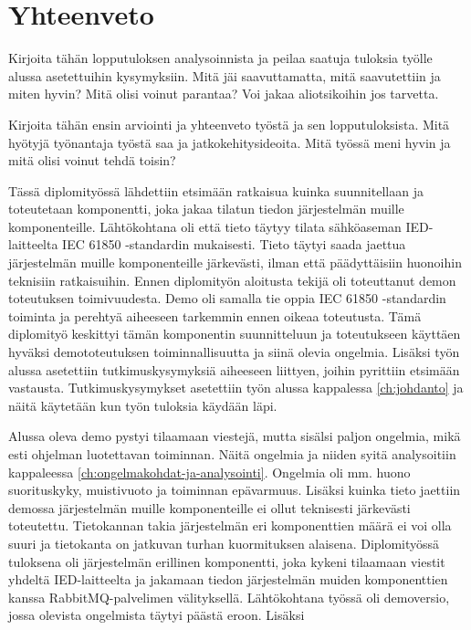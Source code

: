 \chapter{Yhteenveto}
\label{ch:yhteenveto}
\begin{it}
	Kirjoita tähän lopputuloksen analysoinnista ja peilaa saatuja tuloksia työlle alussa asetettuihin kysymyksiin. Mitä jäi saavuttamatta, mitä saavutettiin ja miten hyvin? Mitä olisi voinut parantaa? Voi jakaa aliotsikoihin jos tarvetta.

	Kirjoita tähän ensin arviointi ja yhteenveto työstä ja sen lopputuloksista. Mitä hyötyjä työnantaja työstä saa ja jatkokehitysideoita. Mitä työssä meni hyvin ja mitä olisi voinut tehdä toisin?
\end{it}
Tässä diplomityössä lähdettiin etsimään ratkaisua kuinka suunnitellaan ja toteutetaan komponentti, joka jakaa tilatun tiedon järjestelmän muille komponenteille. Lähtökohtana oli että tieto täytyy tilata sähköaseman IED-laitteelta IEC 61850 -standardin mukaisesti. Tieto täytyi saada jaettua järjestelmän muille komponenteille järkevästi, ilman että päädyttäisiin huonoihin teknisiin ratkaisuihin. Ennen diplomityön aloitusta tekijä oli toteuttanut demon toteutuksen toimivuudesta. Demo oli samalla tie oppia IEC 61850 -standardin toiminta ja perehtyä aiheeseen tarkemmin ennen oikeaa toteutusta. Tämä diplomityö keskittyi tämän komponentin suunnitteluun ja toteutukseen käyttäen hyväksi demototeutuksen toiminnallisuutta ja siinä olevia ongelmia. Lisäksi työn alussa asetettiin tutkimuskysymyksiä aiheeseen liittyen, joihin pyrittiin etsimään vastausta. Tutkimuskysymykset asetettiin työn alussa kappalessa \ref{ch:johdanto} ja näitä käytetään kun työn tuloksia käydään läpi.

Alussa oleva demo pystyi tilaamaan viestejä, mutta sisälsi paljon ongelmia, mikä esti ohjelman luotettavan toiminnan. Näitä ongelmia ja niiden syitä analysoitiin kappaleessa \ref{ch:ongelmakohdat-ja-analysointi}. Ongelmia oli mm. huono suorituskyky, muistivuoto ja toiminnan epävarmuus. Lisäksi kuinka tieto jaettiin demossa järjestelmän muille komponenteille ei ollut teknisesti järkevästi toteutettu. Tietokannan takia järjestelmän eri komponenttien määrä ei voi olla suuri ja tietokanta on jatkuvan turhan kuormituksen alaisena.
Diplomityössä tuloksena oli järjestelmän erillinen komponentti, joka kykeni tilaamaan viestit yhdeltä IED-laitteelta ja jakamaan tiedon järjestelmän muiden komponenttien kanssa RabbitMQ-palvelimen välityksellä. Lähtökohtana työssä oli demoversio, jossa olevista ongelmista täytyi päästä eroon. Lisäksi 
